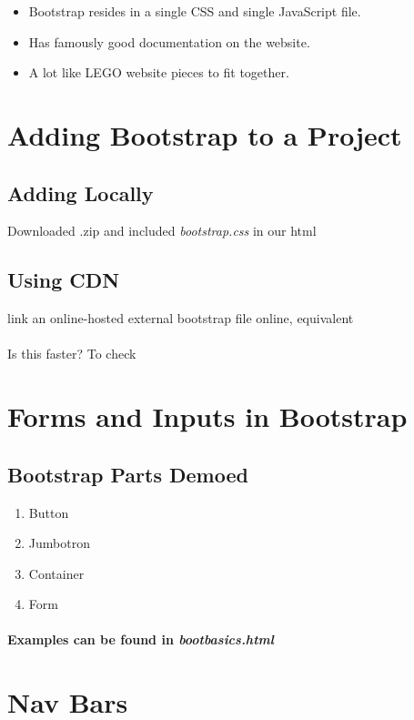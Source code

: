 \documentclass{article}
\begin{document}
	\begin{itemize}
	\itemsep0em
	\item Bootstrap resides in a single CSS and single JavaScript file.
	\item Has famously good documentation on the website.
	\item A lot like LEGO website pieces to fit together.
	\end{itemize}

\section{Adding Bootstrap to a Project}

	\subsection*{Adding Locally}
	Downloaded .zip and included \textit{bootstrap.css} in our html
	
	\subsection*{Using CDN}
	link an online-hosted external bootstrap file online, equivalent
	\\\\Is this faster? To check

\section{Forms and Inputs in Bootstrap}

	\subsection*{Bootstrap Parts Demoed}
	\begin{enumerate}
		\itemsep0em
		\item Button
		\item Jumbotron
		\item Container
		\item Form
	\end{enumerate}

	\paragraph{Examples can be found in \textit{bootbasics.html}}
	
\section{Nav Bars}
\end{document}
